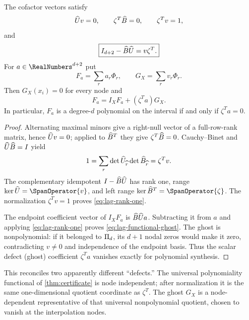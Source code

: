 \begin{theorem}
\label{thm:lag-rank-one}
The cofactor vectors satisfy
\begin{equation}
 \widehat U v=0,
 \qquad \zeta^T\widehat B=0,
 \qquad \zeta^Tv=1,
 \label{eq:lag-cofactor-null}
\end{equation}
and
\begin{equation}
 \boxed{I_{d+2}-\widehat B\widehat U=v\zeta^T.}
 \label{eq:lag-rank-one}
\end{equation}
For $a\in\RealNumbers^{d+2}$ put
\[
 F_a=\sum_ra_r\Phi_r,
 \qquad G_X=\sum_rv_r\Phi_r.
\]
Then $G_X(x_i)=0$ for every node and
\begin{equation}
 \boxed{F_a=I_XF_a+(\zeta^Ta)G_X.}
 \label{eq:lag-functional-ghost}
\end{equation}
In particular, $F_a$ is a degree-$d$ polynomial on the interval if and only
if $\zeta^Ta=0$.
\end{theorem}

\begin{proof}
Alternating maximal minors give a right-null vector of a full-row-rank
matrix, hence $\widehat U v=0$; applied to $\widehat B^T$ they give
$\zeta^T\widehat B=0$.  Cauchy--Binet and
$\widehat U\widehat B=I$ yield
\[
 1=\sum_r\det\widehat U_{\widehat{r}}
       \det\widehat B_{\widehat{r}}=\zeta^Tv.
\]
The complementary idempotent $I-\widehat B\widehat U$ has rank one, range
$\ker\AugmentedEvaluationMatrix=\SpanOperator\{v\}$, and left range
$\ker\AugmentedCoefficientMatrix^T=\SpanOperator\{\zeta\}$.  The normalization
$\zeta^Tv=1$ proves \eqref{eq:lag-rank-one}.

The endpoint coefficient vector of $I_XF_a$ is
$\widehat B\widehat U a$.  Subtracting it from $a$ and applying
\eqref{eq:lag-rank-one} proves \eqref{eq:lag-functional-ghost}.  The ghost is
nonpolynomial: if it belonged to $\Pi_d$, its $d+1$ nodal zeros would make it
zero, contradicting $v\ne0$ and independence of the endpoint basis.  Thus the
scalar defect (ghost) coefficient $\zeta^Ta$ vanishes exactly for polynomial
synthesis.
\end{proof}

This reconciles two apparently different ``defects.''  The universal
polynomiality functional of \cref{thm:certificate} is node independent; after
normalization it is the same one-dimensional quotient coordinate as
$\zeta^T$.  The ghost $G_X$ is a node-dependent representative of that
universal nonpolynomial quotient, chosen to vanish at the interpolation
nodes.

